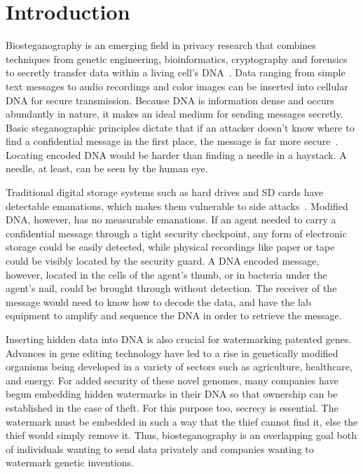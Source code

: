 \documentclass[USenglish,oneside,twocolumn]{article}
\begin{document}
\maketitle
\section{Introduction}

Biosteganography is an emerging field in privacy research that combines techniques from genetic engineering, bioinformatics, cryptography and forensics to secretly transfer data within a living cell's DNA~\cite{B2016JOB}. Data ranging from simple text messages to audio recordings and color images can be inserted into cellular DNA for secure transmission. Because DNA is information dense and occurs abundantly in nature, it makes an ideal medium for sending messages secretly. Basic steganographic principles dictate that if an attacker doesn’t know where to find a confidential message in the first place, the message is far more secure~\cite{A2001IEEEIC}. Locating encoded DNA would be harder than finding a needle in a haystack. A needle, at least, can be seen by the human eye.

Traditional digital storage systems such as hard drives and SD cards have detectable emanations, which makes them vulnerable to side attacks~\cite{T2008TOIAS}. Modified DNA, however, has no measurable emanations. If an agent needed to carry a confidential message through a tight security checkpoint, any form of electronic storage could be easily detected, while physical recordings like paper or tape could be visibly located by the security guard. A DNA encoded message, however, located in the cells of the agent's thumb, or in bacteria under the agent's nail, could be brought through without detection. The receiver of the message would need to know how to decode the data, and have the lab equipment to amplify and sequence the DNA in order to retrieve the message.

Inserting hidden data into DNA is also crucial for watermarking patented genes. Advances in gene editing technology have led to a rise in genetically modified organisms being developed in a variety of sectors such as agriculture, healthcare, and energy. For added security of these novel genomes, many companies have begun embedding hidden watermarks in their DNA so that ownership can be established in the case of theft. For this purpose too, secrecy is essential. The watermark must be embedded in such a way that the thief cannot find it, else the thief would simply remove it. Thus, biosteganography is an overlapping goal both of individuals wanting to send data privately and companies wanting to watermark genetic inventions.
\end{document}
